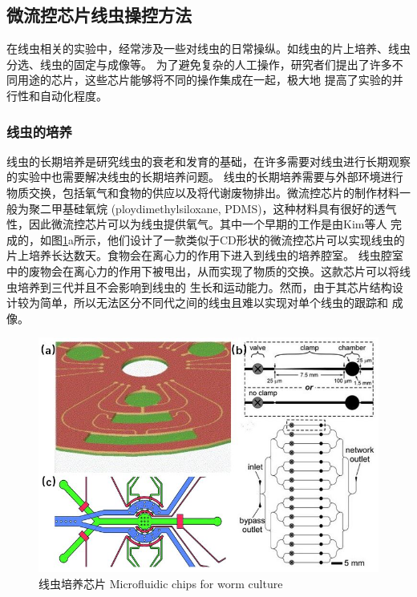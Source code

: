 \subsection{微流控芯片线虫操控方法}
	在线虫相关的实验中，经常涉及一些对线虫的日常操纵。如线虫的片上培养、线虫分选、线虫的固定与成像等。
	为了避免复杂的人工操作，研究者们提出了许多不同用途的芯片，这些芯片能够将不同的操作集成在一起，极大地
	提高了实验的并行性和自动化程度。
	
\subsubsection{线虫的培养}
\label{sec:intro:analog}
	线虫的长期培养是研究线虫的衰老和发育的基础，在许多需要对线虫进行长期观察的实验中也需要解决线虫的长期培养问题。
	线虫的长期培养需要与外部环境进行物质交换，包括氧气和食物的供应以及将代谢废物排出。微流控芯片的制作材料一般为聚二甲基硅氧烷
	(ploydimethylsiloxane, PDMS)，这种材料具有很好的透气性，因此微流控芯片可以为线虫提供氧气。其中一个早期的工作是由Kim等人\cite{Kim2007Automated}
	完成的，如图\ref{fig:cd}a所示，他们设计了一款类似于CD形状的微流控芯片可以实现线虫的片上培养长达数天。食物会在离心力的作用下进入到线虫的培养腔室。
	线虫腔室中的废物会在离心力的作用下被甩出，从而实现了物质的交换。这款芯片可以将线虫培养到三代并且不会影响到线虫的
	生长和运动能力。然而，由于其芯片结构设计较为简单，所以无法区分不同代之间的线虫且难以实现对单个线虫的跟踪和
	成像。
	\begin{figure}[h]
	  \centering
	  \includegraphics[width=12cm]{figure/chap1/wormculture.jpg}
	  \bicaption
		{线虫培养芯片}
		{Microfluidic chips for worm culture}
	  \label{fig:cd}
	\end{figure}
	
